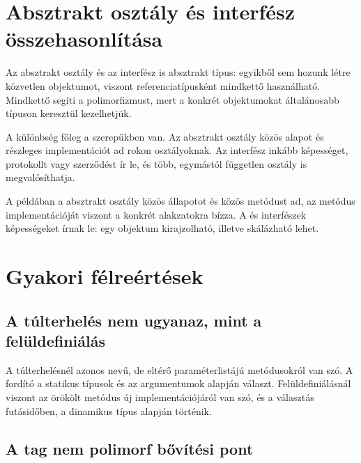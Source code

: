 \section{Absztrakt osztály és interfész összehasonlítása}

Az absztrakt osztály és az interfész is absztrakt típus: egyikből sem hozunk létre közvetlen objektumot, viszont referenciatípusként mindkettő használható. Mindkettő segíti a polimorfizmust, mert a konkrét objektumokat általánosabb típuson keresztül kezelhetjük.

A különbség főleg a szerepükben van. Az absztrakt osztály közös alapot és részleges implementációt ad rokon osztályoknak. Az interfész inkább képességet, protokollt vagy szerződést ír le, és több, egymástól független osztály is megvalósíthatja.

\begin{center}

\end{center}


A példában a  absztrakt osztály közös állapotot és közös metódust ad, az  metódus implementációját viszont a konkrét alakzatokra bízza. A  és  interfészek képességeket írnak le: egy objektum kirajzolható, illetve skálázható lehet.

\section{Gyakori félreértések}

\subsection{A túlterhelés nem ugyanaz, mint a felüldefiniálás}

A túlterhelésnél azonos nevű, de eltérő paraméterlistájú metódusokról van szó. A fordító a statikus típusok és az argumentumok alapján választ. Felüldefiniálásnál viszont az örökölt metódus új implementációjáról van szó, és a választás futásidőben, a dinamikus típus alapján történik.

\subsection{A  tag nem polimorf bővítési pont}

